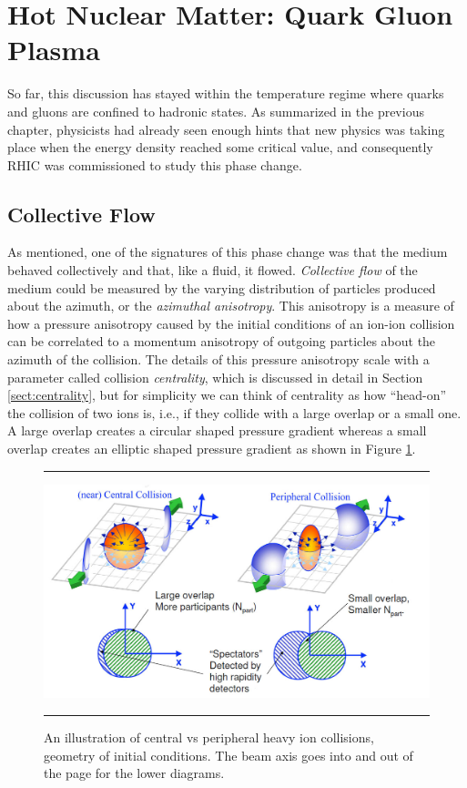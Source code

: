 \section{Hot Nuclear Matter: Quark Gluon Plasma }
So far, this discussion has stayed within the temperature regime where quarks and gluons are confined to hadronic states. As summarized in the previous chapter, physicists had already seen enough hints that new physics was taking place when the energy density reached some critical value, and consequently RHIC was commissioned to study this phase change.

\subsection{Collective Flow}
As mentioned, one of the signatures of this phase change was that the medium behaved collectively and that, like a fluid, it flowed. \textit{Collective flow} of the medium could be measured by the varying distribution of particles produced about the azimuth, or the \textit{azimuthal anisotropy}. This anisotropy is a measure of how a pressure anisotropy caused by the initial conditions of an ion-ion collision can be correlated to a momentum anisotropy of outgoing particles about the azimuth of the collision. The details of this pressure anisotropy scale with a parameter called collision \textit{centrality}, which is discussed in detail in Section \ref{sect:centrality}, but for simplicity we can think of centrality as how ``head-on'' the collision of two ions is, i.e., if they collide with a large overlap or a small one. A large overlap creates a circular shaped pressure gradient whereas a small overlap creates an elliptic shaped pressure gradient as shown in Figure \ref{fig:centvsperiph1}.

\begin{figure}[htbp]
\centering
\rule{35em}{0.5pt}
    \includegraphics[width=1\textwidth]{Figures/centralvsperipheral.jpg}    

	\caption[Central vs Peripheral collisions, geometry of initial conditions]{An illustration of central vs peripheral heavy ion collisions, geometry of initial conditions. The beam axis goes into and out of the page for the lower diagrams.}
\label{fig:centvsperiph1}
\rule{35em}{0.5pt}
\end{figure}

